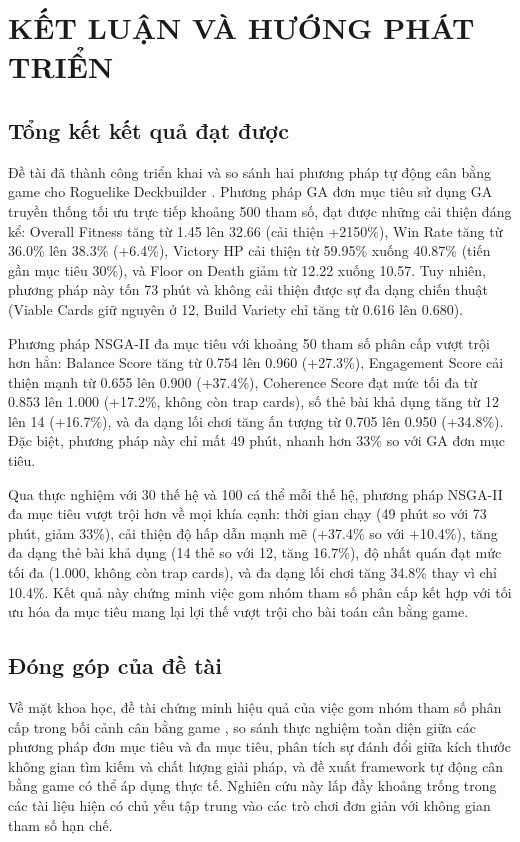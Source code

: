 \clearpage
{}
\chapter{KẾT LUẬN VÀ HƯỚNG PHÁT TRIỂN}

\section{Tổng kết kết quả đạt được}

Đề tài đã thành công triển khai và so sánh hai phương pháp tự động cân bằng game cho Roguelike Deckbuilder \cite{slaythespire}. Phương pháp GA đơn mục tiêu sử dụng GA truyền thống tối ưu trực tiếp khoảng 500 tham số, đạt được những cải thiện đáng kể: Overall Fitness tăng từ 1.45 lên 32.66 (cải thiện +2150\%), Win Rate tăng từ 36.0\% lên 38.3\% (+6.4\%), Victory HP cải thiện từ 59.95\% xuống 40.87\% (tiến gần mục tiêu 30\%), và Floor on Death giảm từ 12.22 xuống 10.57. Tuy nhiên, phương pháp này tốn 73 phút và không cải thiện được sự đa dạng chiến thuật (Viable Cards giữ nguyên ở 12, Build Variety chỉ tăng từ 0.616 lên 0.680).

Phương pháp NSGA-II đa mục tiêu với khoảng 50 tham số phân cấp vượt trội hơn hẳn: Balance Score tăng từ 0.754 lên 0.960 (+27.3\%), Engagement Score cải thiện mạnh từ 0.655 lên 0.900 (+37.4\%), Coherence Score đạt mức tối đa từ 0.853 lên 1.000 (+17.2\%, không còn trap cards), số thẻ bài khả dụng tăng từ 12 lên 14 (+16.7\%), và đa dạng lối chơi tăng ấn tượng từ 0.705 lên 0.950 (+34.8\%). Đặc biệt, phương pháp này chỉ mất 49 phút, nhanh hơn 33\% so với GA đơn mục tiêu.

Qua thực nghiệm với 30 thế hệ và 100 cá thể mỗi thế hệ, phương pháp NSGA-II đa mục tiêu vượt trội hơn về mọi khía cạnh: thời gian chạy (49 phút so với 73 phút, giảm 33\%), cải thiện độ hấp dẫn mạnh mẽ (+37.4\% so với +10.4\%), tăng đa dạng thẻ bài khả dụng (14 thẻ so với 12, tăng 16.7\%), độ nhất quán đạt mức tối đa (1.000, không còn trap cards), và đa dạng lối chơi tăng 34.8\% thay vì chỉ 10.4\%. Kết quả này chứng minh việc gom nhóm tham số phân cấp kết hợp với tối ưu hóa đa mục tiêu mang lại lợi thế vượt trội cho bài toán cân bằng game.

\section{Đóng góp của đề tài}

Về mặt khoa học, đề tài chứng minh hiệu quả của việc gom nhóm tham số phân cấp trong bối cảnh cân bằng game \cite{preuss2012multiobjective}, so sánh thực nghiệm toàn diện giữa các phương pháp đơn mục tiêu và đa mục tiêu, phân tích sự đánh đổi giữa kích thước không gian tìm kiếm và chất lượng giải pháp, và đề xuất framework tự động cân bằng game có thể áp dụng thực tế. Nghiên cứu này lấp đầy khoảng trống trong các tài liệu hiện có chủ yếu tập trung vào các trò chơi đơn giản với không gian tham số hạn chế.

